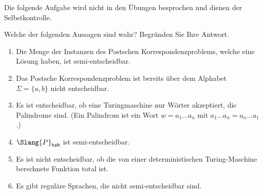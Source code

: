 \documentclass[german]{latteachCD}[2017/03/28]
\begin{document}
\maketitle

\begin{mdframed}
  Die folgende Aufgabe wird nicht in den Übungen besprochen und dienen der
  Selbstkontrolle.

  \renewcommand{\theexercise}{\Alph{exercise}}
  \setcounter{exercise}{6}

  \begin{exercise}
    Welche der folgenden Aussagen sind wahr? Begründen Sie Ihre Antwort.
    \begin{enumerate}
    \item Die Menge der Instanzen des Postschen Korrespondenzproblems, welche
      eine Lösung haben, ist semi-entscheidbar.
    \item Das Postsche Korrespondenzproblem ist bereits über dem Alphabet
      $\Sigma = \{a, b\}$ nicht entscheidbar.
    \item Es ist entscheidbar, ob eine Turingmaschine nur Wörter akzeptiert, die
      Palindrome sind. (Ein Palindrom ist ein Wort $w = a_{1} \dots a_{n}$ mit
      $a_{1} \dots a_{n} = a_{n} \dots a_{1}$.)
    \item $\Slang{P}_{\mathsf{halt}}$ ist semi-entscheidbar.
    \item Es ist nicht entscheidbar, ob die von einer deterministischen
      Turing-Maschine berechnete Funktion total ist.
    \item Es gibt reguläre Sprachen, die nicht semi-entscheidbar sind.
    \end{enumerate}

    \vspace*{-0.5\baselineskip}
  \end{exercise}
\end{mdframed}

\vspace*{0.5\baselineskip}

\setcounter{exercise}{0}
\end{document}
